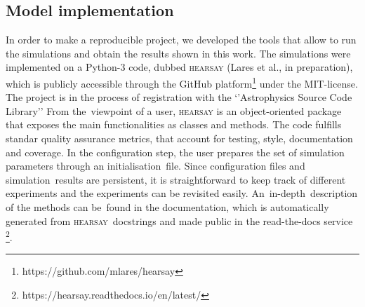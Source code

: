 \documentclass[crop]{CSLB}
\newcommand{\hs}{\textsc{hearsay}}
\begin{document}
\subsection{Model implementation}


%
In order to make a reproducible project, we developed the tools
that allow to run the simulations and obtain the results shown in this work.
%
The simulations were implemented on a Python-3 code, dubbed \hs{} (Lares et al., in preparation),
which is publicly accessible through the GitHub
platform\footnote{https://github.com/mlares/hearsay} under the
MIT-license.
%
The project is in the process of registration with the ‘’Astrophysics
Source Code Library’’ \citep[ASCL, ][]{2015JORS....3E..15A,
2020ASPC..522..731A}
%
From the viewpoint of a user, \hs{} is an object-oriented package that
exposes the main functionalities as classes and methods.
%
The code fulfills standar quality assurance metrics, that account for
testing, style, documentation and coverage.
%
In the configuration step, the user prepares the set of simulation
parameters through an initialisation file.
%
Since configuration files and simulation results are persistent, it is
straightforward to keep track of different experiments and the
experiments can be revisited easily.
%
An in-depth description of the methods can be found in the
documentation, which is automatically generated from \hs{} docstrings
and made public in the read-the-docs service
\footnote{https://hearsay.readthedocs.io/en/latest/}.
\end{document}
